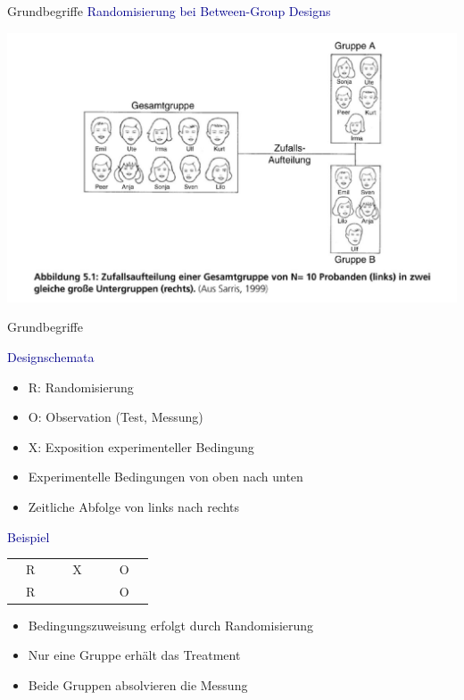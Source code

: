 \documentclass[
  8pt,
  ignorenonframetext,
]{beamer}
\providecommand{\tightlist}{%
  \setlength{\itemsep}{0pt}\setlength{\parskip}{0pt}}
\begin{document}
\begin{frame}{Grundbegriffe}
\protect\hypertarget{grundbegriffe-7}{}
\textcolor{darkblue}{Randomisierung bei Between-Group Designs} \vfill

\begin{center}\includegraphics[width=0.85\linewidth]{8_Abbildungen/alm_8_randomisierung} \end{center}
\vfill
\end{frame}

\begin{frame}{Grundbegriffe}
\protect\hypertarget{grundbegriffe-8}{}

\textcolor{darkblue}{Designschemata}

\begin{itemize}
\tightlist
\item
  R: Randomisierung
\item
  O: Observation (Test, Messung)
\item
  X: Exposition experimenteller Bedingung
\item
  Experimentelle Bedingungen von oben nach unten
\item
  Zeitliche Abfolge von links nach rechts
\end{itemize}

\vspace{1mm}

\textcolor{darkblue}{Beispiel}

\center
\begin{tabular}{|ccc|}
\hline
$\quad$R$\quad$  & $\quad$X$\quad$ & $\quad$O$\quad$
\\
$\quad$R$\quad$  & $\quad$ $\quad$ & $\quad$O$\quad$
\\\hline
\end{tabular}
\vspace{2mm}

\begin{itemize}
\tightlist
\item
  \small Bedingungszuweisung erfolgt durch Randomisierung
\item
  Nur eine Gruppe erhält das Treatment
\item
  Beide Gruppen absolvieren die Messung
\end{itemize}
\end{frame}
\end{document}

